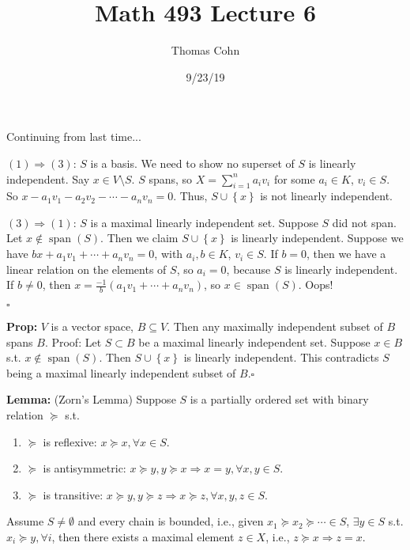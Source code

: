 \documentclass[10pt,letterpaper]{article}
\author{Thomas Cohn}
\title{Math 493 Lecture 6}
\date{9/23/19} %
\newcommand{\n}{\hfill\break}
\newcommand{\hangblock}[2]{\par\noindent\settowidth{\hangindent}{\textbf{#1: }}\textbf{#1: }\!\!\!#2}
\newcommand{\lemma}[1]{\hangblock{Lemma}{#1}}
\newcommand{\prop}[1]{\hangblock{Prop}{#1}}
\newcommand{\proven}{\;$\square$\n}
\newcommand{\set}[1]{\left\{#1\right\}}
\newcommand{\cut}{\setminus}
\DeclareMathOperator{\vspan}{span}
\newcommand{\st}{s.t.}
\begin{document}
\maketitle
\setlength\RaggedRightParindent{\parindent}
\RaggedRight

\par\noindent
Continuing from last time...\n

\par\noindent
$(1)\Rightarrow(3)$: $S$ is a basis. We need to show no superset of $S$ is linearly independent. Say $x\in{}V\cut{}S$. $S$ spans, so $X=\sum_{i=1}^{n}a_{i}v_{i}$ for some $a_{i}\in{}K$, $v_{i}\in{}S$. So $x-a_{1}v_{1}-a_{2}v_{2}-\cdots-a_{n}v_{n}=0$. Thus, $S\cup\set{x}$ is not linearly independent.\n

\par\noindent
$(3)\Rightarrow(1)$: $S$ is a maximal linearly independent set. Suppose $S$ did not span. Let $x\not\in\vspan(S)$. Then we claim $S\cup\set{x}$ is linearly independent. Suppose we have $bx+a_{1}v_{1}+\cdots+a_{n}v_{n}=0$, with $a_{i},b\in{}K$, $v_{i}\in{}S$. If $b=0$, then we have a linear relation on the elements of $S$, so $a_{i}=0$, because $S$ is linearly independent. If $b\ne{}0$, then $x=\frac{-1}{b}(a_{1}v_{1}+\cdots+a_{n}v_{n})$, so $x\in\vspan(S)$. Oops!\n

\par\noindent
\proven

\prop{
	$V$ is a vector space, $B\subseteq{}V$. Then any maximally independent subset of $B$ spans $B$.\n
	Proof: Let $S\subset{}B$ be a maximal linearly independent set. Suppose $x\in{}B$ \st{} $x\not\in\vspan(S)$. Then $S\cup\set{x}$ is linearly independent. This contradicts $S$ being a maximal linearly independent subset of $B$.\proven
}

\lemma{
	(Zorn's Lemma) Suppose $S$ is a partially ordered set with binary relation $\succeq$ \st{}
	\begin{enumerate}
		\item $\succeq$ is reflexive: $x\succeq{}x,\forall{}x\in{}S$.
		\item $\succeq$ is antisymmetric: $x\succeq{}y,y\succeq{}x\Rightarrow{}x=y,\forall{}x,y\in{}S$.
		\item $\succeq$ is transitive: $x\succeq{}y,y\succeq{}z\Rightarrow{}x\succeq{}z,\forall{}x,y,z\in{}S$.
	\end{enumerate}
	Assume $S\ne\emptyset$ and every chain is bounded, i.e., given $x_{1}\succeq{}x_{2}\succeq\cdots\in{}S$, $\exists{}y\in{}S$ \st{} $x_{i}\succeq{}y,\forall{}i$, then there exists a maximal element $z\in{}X$, i.e., $z\succeq{}x\Rightarrow{}z=x$.\n
}
\end{document}
